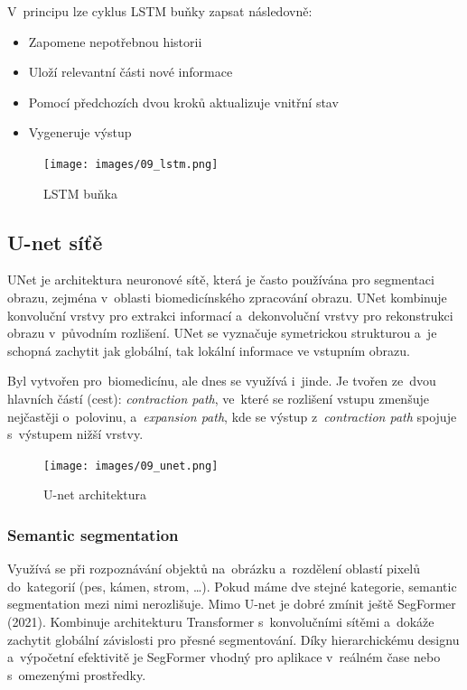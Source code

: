 V~principu lze cyklus LSTM buňky zapsat následovně:
\begin{itemize}
    \item Zapomene nepotřebnou historii
    \item Uloží relevantní části nové informace
    \item Pomocí předchozích dvou kroků aktualizuje vnitřní stav
    \item Vygeneruje výstup
\end{itemize}

\begin{figure}[h]
    \centering
    \texttt{[image: images/09\_lstm.png]}
    \caption{LSTM buňka}
    \label{LSTM}
\end{figure}
\FloatBarrier

\subsection{U-net síťě}

UNet je architektura neuronové sítě, která je často používána pro segmentaci obrazu, zejména v~oblasti biomedicínského zpracování obrazu. UNet kombinuje konvoluční vrstvy pro extrakci informací a~dekonvoluční vrstvy pro rekonstrukci obrazu v~původním rozlišení. UNet se vyznačuje symetrickou strukturou a~je schopná zachytit jak globální, tak lokální informace ve vstupním obrazu.

Byl vytvořen pro~biomedicínu, ale dnes se využívá i~jinde.
Je tvořen ze~dvou hlavních částí (cest):
\emph{contraction path}, ve~které se rozlišení vstupu zmenšuje nejčastěji o~polovinu,
a~\emph{expansion path}, kde se výstup z~\emph{contraction path} spojuje s~výstupem nižší vrstvy.

\begin{figure}[h]
    \centering
    \texttt{[image: images/09\_unet.png]}
    \caption{U-net architektura}
    \label{U-net}
\end{figure}

\subsubsection{Semantic segmentation}

Využívá se při rozpoznávání objektů na~obrázku a~rozdělení oblastí pixelů do~kategorií (pes, kámen, strom, \dots). Pokud máme dve stejné kategorie, semantic segmentation mezi nimi nerozlišuje. Mimo U-net je dobré zmínit ještě SegFormer (2021). Kombinuje architekturu Transformer s~konvolučními sítěmi a~dokáže zachytit globální závislosti pro přesné segmentování. Díky hierarchickému designu a~výpočetní efektivitě je SegFormer vhodný pro aplikace v~reálném čase nebo s~omezenými prostředky.




